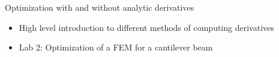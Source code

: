 \documentclass[aspectratio=169, usenames,dvipsnames, 14pt]{beamer}
\begin{document}

\begingroup
{}
\begin{frame}{Optimization with and without analytic derivatives}

    \begin{itemize}
        \item High level introduction to different methods of computing derivatives
        \vspace{0.5cm}
        \item Lab 2: Optimization of a FEM for a cantilever beam
    \end{itemize}
    
\end{frame}
\endgroup

\end{document}
